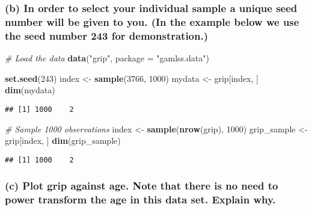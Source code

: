 \documentclass[
]{article}
\newenvironment{Shaded}{\begin{snugshade}}{\end{snugshade}}
\newcommand{\AttributeTok}[1]{\textcolor[rgb]{0.13,0.29,0.53}{#1}}
\newcommand{\CommentTok}[1]{\textcolor[rgb]{0.56,0.35,0.01}{\textit{#1}}}
\newcommand{\DecValTok}[1]{\textcolor[rgb]{0.00,0.00,0.81}{#1}}
\newcommand{\FunctionTok}[1]{\textcolor[rgb]{0.13,0.29,0.53}{\textbf{#1}}}
\newcommand{\NormalTok}[1]{#1}
\newcommand{\OtherTok}[1]{\textcolor[rgb]{0.56,0.35,0.01}{#1}}
\newcommand{\StringTok}[1]{\textcolor[rgb]{0.31,0.60,0.02}{#1}}
\begin{document}
\hypertarget{b-in-order-to-select-your-individual-sample-a-unique-seed-number-will-be-given-to-you.-in-the-example-below-we-use-the-seed-number-243-for-demonstration.}{%
\subsubsection{(b) In order to select your individual sample a unique
seed number will be given to you. (In the example below we use the seed
number 243 for
demonstration.)}\label{b-in-order-to-select-your-individual-sample-a-unique-seed-number-will-be-given-to-you.-in-the-example-below-we-use-the-seed-number-243-for-demonstration.}}

\begin{Shaded}
\begin{Highlighting}[]
\CommentTok{\# Load the data}
\FunctionTok{data}\NormalTok{(}\StringTok{"grip"}\NormalTok{, }\AttributeTok{package =} \StringTok{"gamlss.data"}\NormalTok{)}

\FunctionTok{set.seed}\NormalTok{(}\DecValTok{243}\NormalTok{) }
\NormalTok{index }\OtherTok{\textless{}{-}} \FunctionTok{sample}\NormalTok{(}\DecValTok{3766}\NormalTok{, }\DecValTok{1000}\NormalTok{) }
\NormalTok{mydata }\OtherTok{\textless{}{-}}\NormalTok{ grip[index, ] }
\FunctionTok{dim}\NormalTok{(mydata)}
\end{Highlighting}
\end{Shaded}

\begin{verbatim}
## [1] 1000    2
\end{verbatim}

\begin{Shaded}
\begin{Highlighting}[]
\CommentTok{\# Sample 1000 observations}
\NormalTok{index }\OtherTok{\textless{}{-}} \FunctionTok{sample}\NormalTok{(}\FunctionTok{nrow}\NormalTok{(grip), }\DecValTok{1000}\NormalTok{)}
\NormalTok{grip\_sample }\OtherTok{\textless{}{-}}\NormalTok{ grip[index, ]}
\FunctionTok{dim}\NormalTok{(grip\_sample)}
\end{Highlighting}
\end{Shaded}

\begin{verbatim}
## [1] 1000    2
\end{verbatim}

\hypertarget{c-plot-grip-against-age.-note-that-there-is-no-need-to-power-transform-the-age-in-this-data-set.-explain-why.}{%
\subsubsection{(c) Plot grip against age. Note that there is no need to
power transform the age in this data set. Explain
why.}\label{c-plot-grip-against-age.-note-that-there-is-no-need-to-power-transform-the-age-in-this-data-set.-explain-why.}}
\end{document}
